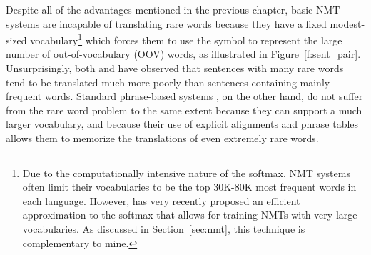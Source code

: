 
Despite all of the advantages mentioned in the previous chapter, basic NMT systems are incapable of translating rare 
words because they have a fixed modest-sized vocabulary\footnote{ Due to the computationally intensive nature of the softmax, NMT systems often limit 
their vocabularies to be the top 30K-80K most frequent words in each language. However, 
has very recently proposed an efficient approximation to the softmax that allows
for training NMTs with very large vocabularies. As discussed in Section~\ref{sec:nmt}, this technique is complementary to mine.}
which forces them to use the \unksym{} symbol to 
represent the large number of out-of-vocabulary (OOV) words, as illustrated in Figure~\ref{f:sent_pair}.
Unsurprisingly, both  and  have
observed that sentences with many rare words tend to be translated much more poorly than sentences
containing mainly frequent words.
%
Standard phrase-based systems \cite{koehn2007moses,chiang07hiero,cer10phrasal,dyer10cdec}, 
on the other hand, do not suffer from the rare word 
problem to the same extent because they can support a much larger vocabulary, 
and because their use of explicit alignments
and phrase tables allows them to memorize the translations 
of even extremely rare words. 

